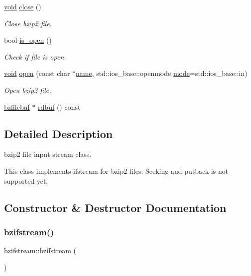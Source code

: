 \begin{DoxyCompactItemize}
\hyperlink{lp__lib_8h_ac7828c7b2b31d2e11af17bdb6289c5d9}{void} \hyperlink{classbzifstream_a227014b7b7ff86c2d94f33f2b8cfe7b4}{close} ()
\begin{DoxyCompactList}\small\item\em Close bzip2 file. \end{DoxyCompactList}\item 
bool \hyperlink{classbzifstream_a442f2f140a70f59f1580c8344b0dc441}{is\+\_\+open} ()
\begin{DoxyCompactList}\small\item\em Check if file is open. \end{DoxyCompactList}\item 
\hyperlink{lp__lib_8h_ac7828c7b2b31d2e11af17bdb6289c5d9}{void} \hyperlink{classbzifstream_aebe1df7c3afcdd96f729ed6601e13072}{open} (const char $\ast$\hyperlink{lp__lib_8h_a2946c588fc7fa2fa5b43ac54b7872725}{name}, std\+::ios\+\_\+base\+::openmode \hyperlink{ioapi_8h_ab77191763734fbb3e515371393ccb606}{mode}=std\+::ios\+\_\+base\+::in)
\begin{DoxyCompactList}\small\item\em Open bzip2 file. \end{DoxyCompactList}\item 
\hyperlink{classbzfilebuf}{bzfilebuf} $\ast$ \hyperlink{classbzifstream_a07147737294e17e3d9ff3da4ab2ca8f5}{rdbuf} () const
\end{DoxyCompactItemize}


\subsection{Detailed Description}
bzip2 file input stream class. 

This class implements ifstream for bzip2 files. Seeking and putback is not supported yet. 

\subsection{Constructor \& Destructor Documentation}
\mbox{\label{classbzifstream_a29da9b74472478ba184f4b56eaa8eed3}} 
\subsubsection{\texorpdfstring{bzifstream()}{bzifstream()}\hspace{0.1cm}{\footnotesize\ttfamily [1/3]}}
{\footnotesize\ttfamily bzifstream\+::bzifstream (\begin{DoxyParamCaption}{ }\end{DoxyParamCaption})}

